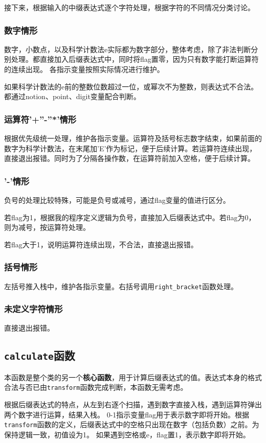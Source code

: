 \documentclass[UTF8]{ctexart}
\begin{document}
接下来，根据输入的中缀表达式逐个字符处理，根据字符的不同情况分类讨论。
\subsubsection{数字情形}
数字，小数点，以及科学计数法e实际都为数字部分，整体考虑，除了非法判断分别处理。都直接加入后缀表达式中，同时将flag置零，因为只有数字能打断运算符的连续出现。
各指示变量按照实际情况进行维护。

如果科学计数法的e前的整数位数超过一位，或幂次不为整数，则表达式不合法。都通过notion、point、digit变量配合判断。
\subsubsection{运算符'+''-''*'情形}
根据优先级统一处理，维护各指示变量。运算符及括号标志数字结束，如果前面的数字为科学计数法，在末尾加'E'作为标记，便于后续计算。若运算符连续出现，直接退出报错。同时为了分隔各操作数，在运算符前加入空格，便于后续计算。
\subsubsection{'-'情形}
负号的处理比较特殊，可能是负号或减号，通过flag变量的值进行区分。

若flag为1，根据我的程序定义逻辑为负号，直接加入后缀表达式中。若flag为0，则为减号，按运算符处理。

若flag大于1，说明运算符连续出现，不合法，直接退出报错。
\subsubsection{括号情形}
左括号推入栈中，维护各指示变量。右括号调用\texttt{right\_bracket}函数处理。
\subsubsection{未定义字符情形}
直接退出报错。

\subsection{\texttt{calculate}函数}
本函数是整个类的另一个\textbf{核心函数}，用于计算后缀表达式的值。表达式本身的格式合法与否已由\texttt{transform}函数完成判断，本函数无需考虑。

根据后缀表达式的特点，从左到右逐个扫描，遇到数字直接入栈，遇到运算符弹出两个数字进行运算，结果入栈。
0-1指示变量flag用于表示数字即将开始。根据\texttt{transform}函数的定义，后缀表达式中的空格只出现在数字（包括负数）之前。为保持逻辑一致，初值设为1。
如果遇到空格或e，flag置1，表示数字即将开始。
\end{document}
